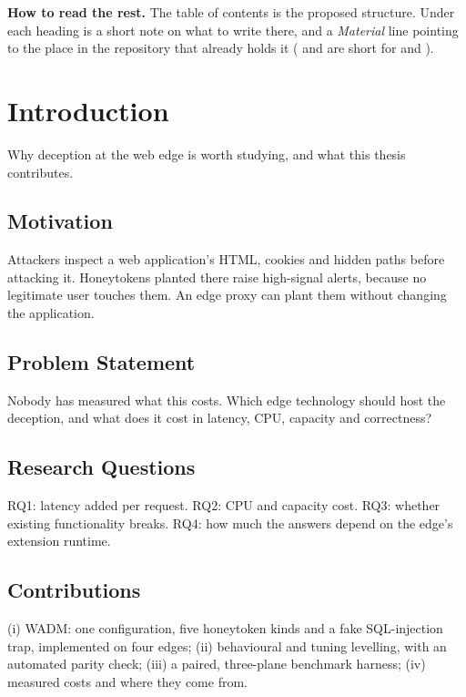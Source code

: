 \documentclass{rptuma}
\begin{document}
\textbf{How to read the rest.} The table of contents is the proposed structure. Under each
heading is a short note on what to write there, and a \emph{Material} line pointing to the
place in the repository that already holds it ( and  are short for
 and ).

\frontmatternote

\tableofcontents
\cleardoublepage
{}

\chapter{Introduction}
Why deception at the web edge is worth studying, and what this thesis contributes.

\section{Motivation}
Attackers inspect a web application's HTML, cookies and hidden paths before attacking it.
Honeytokens planted there raise high-signal alerts, because no legitimate user touches them. An
edge proxy can plant them without changing the application.

\section{Problem Statement}
Nobody has measured what this costs. Which edge technology should host the deception, and what
does it cost in latency, CPU, capacity and correctness?

\section{Research Questions}
RQ1: latency added per request. RQ2: CPU and capacity cost. RQ3: whether existing functionality
breaks. RQ4: how much the answers depend on the edge's extension runtime.

\section{Contributions}
(i) WADM: one configuration, five honeytoken kinds and a fake SQL-injection trap, implemented on
four edges; (ii) behavioural and tuning levelling, with an automated parity check; (iii) a paired,
three-plane benchmark harness; (iv) measured costs and where they come from.
\end{document}
